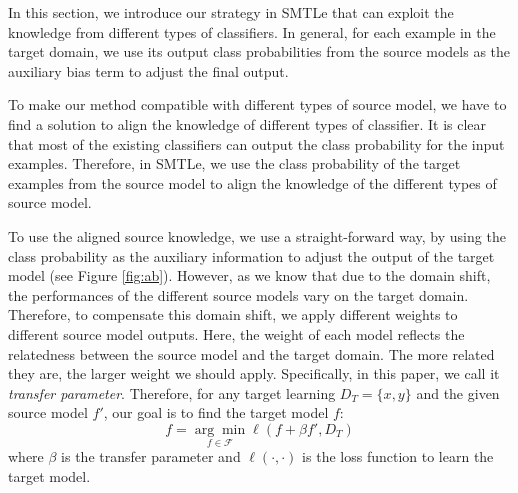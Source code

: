 In this section, we introduce our strategy in SMTLe that can exploit the knowledge from different types of classifiers. In general, for each example in the target domain, we use its output class probabilities from the source models as the auxiliary bias term to adjust the final output.

To make our method compatible with different types of source model, we have to find a solution to align the knowledge of different types of classifier. It is clear that most of the existing classifiers can output the class probability for the input examples. Therefore, in SMTLe, we use the class probability of the target examples from the source model to align the knowledge of the different types of source model.  

To use the aligned source knowledge, we use a straight-forward way, by using the class probability as the auxiliary information to adjust the output of the target model (see Figure \ref{fig:ab}).
However, as we know that due to the domain shift, the performances of the different source models vary on the target domain. Therefore, to compensate this domain shift, we apply different weights to different source model outputs. Here, the weight of each model reflects the relatedness between the source model and the target domain. The more related they are, the larger weight we should apply. Specifically, in this paper, we call it \textit{transfer parameter}. Therefore, for any target learning $D_T=\{x,y\}$ and the given source model $f'$, our goal is to find the target model $f$:
\begin{equation}\label{eq:low_opt}
f=\underset{f \in \mathcal{F}}{\arg \min}\ell\left(f+\beta f',D_T\right)
\end{equation} 
where $\beta$ is the transfer parameter and $\ell(\cdot,\cdot)$ is the loss function to learn the target model.

